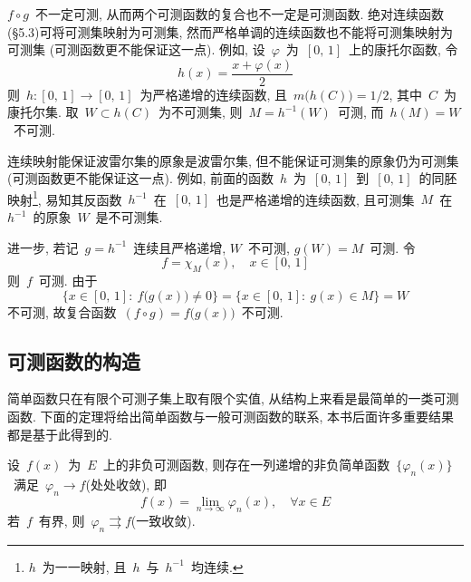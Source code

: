 \begin{remark}
$f \circ g$~不一定可测, 从而两个可测函数的复合也不一定是可测函数. 绝对连续函数(\S 5.3)可将可测集映射为可测集, 然而严格单调的连续函数也不能将可测集映射为可测集
(可测函数更不能保证这一点). 例如, 设~$\varphi$~为~$[0,\,1]$~上的康托尔函数, 令
\[
h(x) = \frac{x + \varphi(x)}{2}
\]
则~$h: [0,\,1] \rightarrow [0,\,1]$~为严格递增的连续函数, 且~$m\big(h(C)\big)=1/2$, 其中~$C$~为康托尔集.
取~$W \subset h(C)$~为不可测集, 则~$M = h^{-1}(W)$~可测, 而~$h(M) = W$~不可测.

连续映射能保证波雷尔集的原象是波雷尔集, 但不能保证可测集的原象仍为可测集(可测函数更不能保证这一点). 例如, 前面的函数~$h$~为~$[0,\,1]$~到~$[0,\,1]$~的同胚映射\footnote{$h$~为一一映射, 且~$h$~与~$h^{-1}$~均连续.}, 易知其反函数~$h^{-1}$~在~$[0,\,1]$~也是严格递增的连续函数, 且可测集~$M$~在~$h^{-1}$~的原象~$W$~是不可测集.

进一步, 若记~$g = h^{-1}$~连续且严格递增, $W$~不可测, $g(W) = M$~可测. 令
\[
f = \chi_M(x), \quad x \in [0,\,1]
\]
则~$f$~可测. 由于
\[
\big\{ x \in [0,\,1]: \: f\big(g(x)\big) \neq 0 \big\} = \big\{ x \in [0,\,1]: \: g(x) \in M \big\} = W
\]
不可测, 故复合函数~$(f \circ g) = f\big(g(x)\big)$~不可测.
\end{remark}

\subsection{可测函数的构造}

简单函数只在有限个可测子集上取有限个实值, 从结构上来看是最简单的一类可测函数. 下面的定理将给出简单函数与一般可测函数的联系, 本书后面许多重要结果都是基于此得到的.

\begin{theorem} \label{thm311}
设~$f(x)$~为~$E$~上的非负可测函数, 则存在一列递增的非负简单函数~$\{ \varphi_n(x) \}$~满足~$\varphi_n \to f$(处处收敛),  即
\[
f(x) = \lim_{n \to \infty} \varphi_n(x), \quad \forall x \in E
\]
若~$f$~有界, 则~$\varphi_n \rightrightarrows f$(一致收敛).
\end{theorem}

